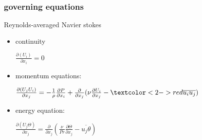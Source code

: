 \documentclass{beamer}
\begin{document}
\begin{frame}
\frametitle{governing equations}
\begin{exampleblock}{Reynolds-averaged Navier stokes}
 \begin{itemize}
      \item 
    continuity

$\frac{\partial (U_i)}{\partial x_i}=0$
      \end{itemize}
       \begin{itemize}
      \item 
      momentum equations:

$\frac{\partial (U_jU_i)}{\partial x_j}=-\frac{1}{\rho}\frac{\partial P}{\partial x_i}+\frac{\partial }{\partial x_j}(\nu\frac{\partial U_i}{\partial x_j}-\textcolor<2->{red}{\overline{u_iu_j}})$
      \end{itemize}    
       \begin{itemize}
      \item 
     energy equation:

$\frac{\partial (U_j\Theta )}{\partial x_j}=\frac{\partial }{\partial x_j}(\frac{\nu}{Pr}\frac{\partial \Theta}{\partial x_j}-\overline{u_j\theta})$
      \end{itemize}
\end{exampleblock}
\end{frame}
\end{document}
